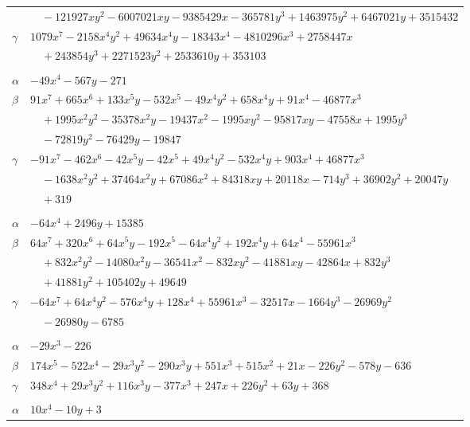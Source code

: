 \documentclass[11pt]{article}
\begin{document}
\begin{longtable}{@{}ll@{}}
 & $\quad -121927xy^{2}-6007021xy-9385429x-365781y^{3}+1463975y^{2}+6467021y+3515432$\\
$\gamma$ & $1079x^{7}-2158x^{4}y^{2}+49634x^{4}y-18343x^{4}-4810296x^{3}+2758447x$\\
 & $\quad +243854y^{3}+2271523y^{2}+2533610y+353103$\\
\addlinespace[3pt]
\multicolumn{2}{@{}l}{$\{i,j\}=\{25,85\}$, $k_{ij}=2^{4}\cdot 3$}\\
$\alpha$ & $-49x^{4}-567y-271$\\
$\beta$ & $91x^{7}+665x^{6}+133x^{5}y-532x^{5}-49x^{4}y^{2}+658x^{4}y+91x^{4}-46877x^{3}$\\
 & $\quad +1995x^{2}y^{2}-35378x^{2}y-19437x^{2}-1995xy^{2}-95817xy-47558x+1995y^{3}$\\
 & $\quad -72819y^{2}-76429y-19847$\\
$\gamma$ & $-91x^{7}-462x^{6}-42x^{5}y-42x^{5}+49x^{4}y^{2}-532x^{4}y+903x^{4}+46877x^{3}$\\
 & $\quad -1638x^{2}y^{2}+37464x^{2}y+67086x^{2}+84318xy+20118x-714y^{3}+36902y^{2}+20047y$\\
 & $\quad +319$\\
\addlinespace[3pt]
\multicolumn{2}{@{}l}{$\{i,j\}=\{25,90\}$, $k_{ij}=3\cdot 5\cdot 11^{2}$}\\
$\alpha$ & $-64x^{4}+2496y+15385$\\
$\beta$ & $64x^{7}+320x^{6}+64x^{5}y-192x^{5}-64x^{4}y^{2}+192x^{4}y+64x^{4}-55961x^{3}$\\
 & $\quad +832x^{2}y^{2}-14080x^{2}y-36541x^{2}-832xy^{2}-41881xy-42864x+832y^{3}$\\
 & $\quad +41881y^{2}+105402y+49649$\\
$\gamma$ & $-64x^{7}+64x^{4}y^{2}-576x^{4}y+128x^{4}+55961x^{3}-32517x-1664y^{3}-26969y^{2}$\\
 & $\quad -26980y-6785$\\
\addlinespace[3pt]
\multicolumn{2}{@{}l}{$\{i,j\}=\{25,104\}$, $k_{ij}=2\cdot 3\cdot 5\cdot 17$}\\
$\alpha$ & $-29x^{3}-226$\\
$\beta$ & $174x^{5}-522x^{4}-29x^{3}y^{2}-290x^{3}y+551x^{3}+515x^{2}+21x-226y^{2}-578y-636$\\
$\gamma$ & $348x^{4}+29x^{3}y^{2}+116x^{3}y-377x^{3}+247x+226y^{2}+63y+368$\\
\addlinespace[3pt]
\multicolumn{2}{@{}l}{$\{i,j\}=\{25,108\}$, $k_{ij}=3^{6}$}\\
$\alpha$ & $10x^{4}-10y+3$\\

\end{longtable}
\end{document}
